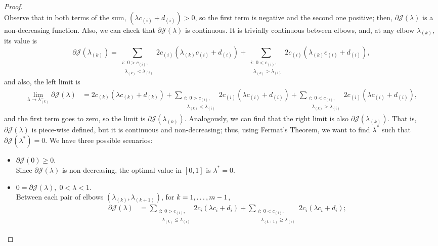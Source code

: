 \begin{proof}
\begin{equation}
    \end{equation}
    Observe that in both terms of the sum, $(\lambda c_{(i)} + d_{(i)}) > 0$, so the first term is negative and the second one positive; then, $\partial \mathcal{J}(\lambda)$ is a non-decreasing function.
    Also, we can check that $\partial \mathcal{J}(\lambda)$ is continuous. It is trivially continuous between elbows, and, at any elbow $\lambda_{(k)}$, its value is
    $$
    \partial \mathcal{J}(\lambda_{(k)}) =  \sum_{\substack{i:\; 0 > c_{(i)},\\ \;\; \lambda_{(k)} < \lambda_{(i)}}} {2 c_{(i)} (\lambda_{(k)} c_{(i)} + d_{(i)})} + \sum_{\substack{i:\; 0 < c_{(i)},\\ \;\; \lambda_{(k)} > \lambda_{(i)}}} {2 c_{(i)} (\lambda_{(k)} c_{(i)} + d_{(i)})}  ,
    $$
    and also, the left limit is 
    \begin{align*}
        \lim_{\lambda \to \lambda_{(k)}^{-}} \partial \mathcal{J}(\lambda) &= 
        2c_{(k)} (\lambda c_{(k)} + d_{(k)})  + 
        \sum_{\substack{i:\; 0 > c_{(i)},\\ \;\; \lambda_{(k)} < \lambda_{(i)}}} {2 c_{(i)} (\lambda c_{(i)} + d_{(i)})} + \sum_{\substack{i:\; 0 < c_{(i)} ,\\ \;\; \lambda_{(k)} > \lambda_{(i)}}} {2 c_{(i)} (\lambda c_{(i)} + d_{(i)})},
    \end{align*}
    and the first term goes to zero, so the limit is $\partial \mathcal{J}(\lambda_{(k)})$. Analogously, we can find that the right limit is also $\partial \mathcal{J}(\lambda_{(k)})$.    
    That is, $\partial \mathcal{J}(\lambda)$ is piece-wise defined, but it is continuous and non-decreasing; thus, using Fermat's Theorem, we want to find $\lambda^*$ such that $\partial \mathcal{J}(\lambda^*) = 0$. We have three possible scenarios:
    \begin{itemize}
        \item $\partial \mathcal{J}(0) \geq 0.$ 
        \\Since $\partial \mathcal{J}(\lambda)$ is non-decreasing, the optimal value in $[0, 1]$ is $\lambda^* = 0$.
        \item $0 = \partial \mathcal{J}(\lambda), \; 0 < \lambda < 1$. 
        \\ Between each pair of elbows $(\lambda_{(k)}, \lambda_{(k+1)})$, for $k=1,  \dots, m-1$, 
        \begin{equation}\nonumber
            \begin{aligned}
                \partial \mathcal{J}(\lambda) &=  \sum_{\substack{i:\; 0 > c_{(i)},\\ \;\; \lambda_{(k)} \leq \lambda_{(i)}}} {2 c_i (\lambda c_i + d_i)} + \sum_{\substack{i:\; 0 < c_{(i)},\\ \;\; \lambda_{(k+1)} \geq \lambda_{(i)}}} {2 c_i (\lambda c_i + d_i)}  ;

\end{aligned}
\end{equation}
\end{itemize}
\end{proof}
